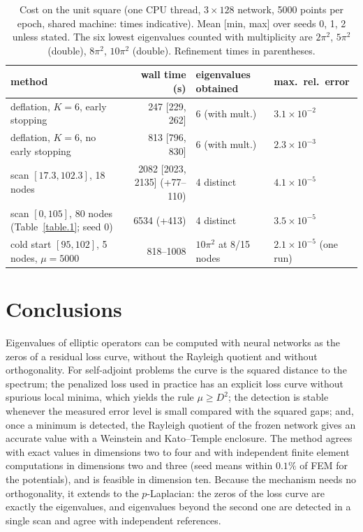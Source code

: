 \documentclass[10pt]{amsart}
\theoremstyle{definition}
\theoremstyle{remark}
\theoremstyle{plain}
\begin{document}
\begin{table}[tbp]
\centering\small
\caption{Cost on the unit square (one CPU thread, $3\times128$ network, 5000 points per epoch, shared machine: times indicative). Mean [min, max] over seeds 0, 1, 2 unless stated. The six lowest eigenvalues counted with multiplicity are $2\pi^2$, $5\pi^2$ (double), $8\pi^2$, $10\pi^2$ (double). Refinement times in parentheses.}
\label{table.cost}
\begin{tabular}{lrll}
\toprule
method & wall time (s) & eigenvalues obtained & max.\ rel.\ error\\
\midrule
deflation, $K=6$, early stopping & 247 [229, 262] & 6 (with mult.) & $3.1\times10^{-2}$\\
deflation, $K=6$, no early stopping & 813 [796, 830] & 6 (with mult.) & $2.3\times10^{-3}$\\
scan $[17.3,102.3]$, 18 nodes & 2082 [2023, 2135] (+77--110) & 4 distinct & $4.1\times10^{-5}$\\
scan $[0,105]$, 80 nodes (Table~\ref{table.1}; seed 0) & 6534 (+413) & 4 distinct & $3.5\times10^{-5}$\\
cold start $[95,102]$, 5 nodes, $\mu=5000$ & 818--1008 & $10\pi^2$ at 8/15 nodes & $2.1\times10^{-5}$ (one run)\\
\bottomrule
\end{tabular}
\end{table}

\section{Conclusions}\label{sec.conclusions}

Eigenvalues of elliptic operators can be computed with neural networks as the zeros of a residual
loss curve, without the Rayleigh quotient and without orthogonality. For self-adjoint problems the
curve is the squared distance to the spectrum; the penalized loss used in practice has an explicit
loss curve without spurious local minima, which yields the rule $\mu\ge D^2$; the detection is stable
whenever the measured error level is small compared with the squared gaps; and, once a minimum is
detected, the Rayleigh quotient of the frozen network gives an accurate value with a Weinstein and
Kato--Temple enclosure. The method agrees with exact values in dimensions two to four and with independent finite element
computations in dimensions two and three (seed means within $0.1\%$ of FEM for the potentials), and is
feasible in dimension ten. Because the mechanism needs no orthogonality, it extends to the
$p$-Laplacian: the zeros of the loss curve are exactly the eigenvalues, and eigenvalues beyond the
second one are detected in a single scan and agree with independent references.
\end{document}

